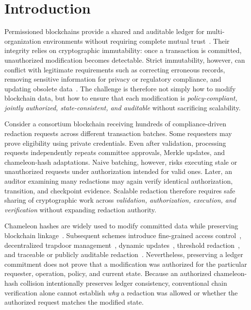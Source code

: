 \documentclass[lettersize,journal]{IEEEtran}
\begin{document}
\section{Introduction}

Permissioned blockchains provide a shared and auditable ledger for
multi-organization environments without requiring complete mutual
trust~\cite{ref7}. Their integrity relies on cryptographic immutability:
once a transaction is committed, unauthorized modification becomes
detectable. Strict immutability, however, can conflict with legitimate
requirements such as correcting erroneous records, removing sensitive
information for privacy or regulatory compliance, and updating obsolete
data~\cite{ref9,ref21,ref22,ref38}. The challenge is therefore not
simply how to modify blockchain data, but how to ensure that each
modification is \emph{policy-compliant, jointly authorized,
state-consistent, and auditable} without sacrificing scalability.

Consider a consortium blockchain receiving hundreds of compliance-driven
redaction requests across different transaction batches. Some requesters
may prove eligibility using private credentials. Even after validation,
processing requests independently repeats committee approvals, Merkle
updates, and chameleon-hash adaptations. Naive batching, however, risks
executing stale or unauthorized requests under authorization intended
for valid ones. Later, an auditor examining many redactions may again
verify identical authorization, transition, and checkpoint evidence.
Scalable redaction therefore requires safe sharing of cryptographic work
across \emph{validation, authorization, execution, and verification}
without expanding redaction authority.

Chameleon hashes are widely used to modify committed data while
preserving blockchain linkage~\cite{ref1,ref2,ref6,ref30}. Subsequent
schemes introduce fine-grained access control~\cite{ref8,ref15},
decentralized trapdoor management~\cite{ref3,ref19}, dynamic
updates~\cite{ref5,ref16}, threshold redaction~\cite{ref27}, and
traceable or publicly auditable redaction~\cite{ref33,ref34,ref35}.
Nevertheless, preserving a ledger commitment does not prove that a
modification was authorized for the particular requester, operation,
policy, and current state. Because an authorized chameleon-hash
collision intentionally preserves ledger consistency, conventional
chain verification alone cannot establish \emph{why} a redaction was
allowed or whether the authorized request matches the modified state.
\end{document}
